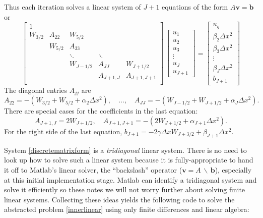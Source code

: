 \documentclass[letterpaper,final,12pt,reqno]{amsart}
\begin{document}
Thus each iteration solves a linear system of $J+1$ equations of the form $A \mathbf{v} = \mathbf{b}$ or
\begin{equation}
\begin{bmatrix}
1 &  &  &  &  \\
W_{3/2} & A_{22} & W_{5/2} &  &  \\
 & W_{5/2} & A_{33} &  &  \\
 &  & \ddots & \ddots &  \\
 &  & W_{J-1/2} & A_{JJ} & W_{J+1/2} \\
 &  &  & A_{J+1,J} & A_{J+1,J+1} \\
\end{bmatrix}\,
\begin{bmatrix}
u_1 \\ u_2 \\ u_3 \\ \vdots \\ u_J \\ u_{J+1}
\end{bmatrix}
=
\begin{bmatrix}
u_g \\ \beta_2 \Delta x^2 \\ \beta_3 \Delta x^2 \\ \vdots \\ \beta_J \Delta x^2 \\ b_{J+1}
\end{bmatrix}  \label{discretematrixform}
\end{equation}
The diagonal entries $A_{jj}$ are
  $$A_{22} = -(W_{3/2}+W_{5/2}+\alpha_2 \Delta x^2), \quad \dots, \quad A_{JJ} = -(W_{J-1/2}+W_{J+1/2}+\alpha_J \Delta x^2).$$
There are special cases for the coefficients in the last equation:
  $$A_{J+1,J} = 2 W_{J+1/2}, \quad A_{J+1,J+1} = -(2 W_{J+1/2}+\alpha_{J+1}\Delta x^2).$$
For the right side of the last equation, $b_{J+1} = -2 \gamma \Delta x W_{J+3/2} + \beta_{J+1} \Delta x^2$.

System \eqref{discretematrixform} is a \emph{tridiagonal} linear system.  There is no need to look up how to solve such a linear system because it is fully-appropriate to hand it off to Matlab's linear solver, the ``backslash'' operator ($\mathbf{v} = A\, \backslash\, \mathbf{b}$), especially at this initial implementation stage.  Matlab can identify a tridiagonal system and solve it efficiently so these notes we will not worry further about solving finite linear systems.  Collecting these ideas yields the following code to solve the abstracted problem \eqref{innerlinear} using only finite differences and linear algebra:
\end{document}
